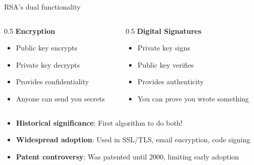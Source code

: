 \ifdefined\PRESENTATION\else\PassOptionsToClass{handout}{beamer}\fi\documentclass[aspectratio=169, lualatex]{beamer}
\begin{document}
\begin{frame}{RSA's dual functionality}
	\begin{columns}[c]
		\begin{column}{0.5\textwidth}
			\textbf{Encryption}
			\begin{itemize}[<+->]
				\item Public key encrypts
				\item Private key decrypts
				\item Provides confidentiality
				\item Anyone can send you secrets
			\end{itemize}
		\end{column}
		\begin{column}{0.5\textwidth}
			\textbf{Digital Signatures}
			\begin{itemize}[<+->]
				\item Private key signs
				\item Public key verifies
				\item Provides authenticity
				\item You can prove you wrote something
			\end{itemize}
		\end{column}
	\end{columns}
	\vspace{0.5cm}
	\begin{itemize}[<+->]
		\item \textbf{Historical significance}: First algorithm to do both!
		\item \textbf{Widespread adoption}: Used in SSL/TLS, email encryption, code signing
		\item \textbf{Patent controversy}: Was patented until 2000, limiting early adoption
	\end{itemize}
\end{frame}
\end{document}
